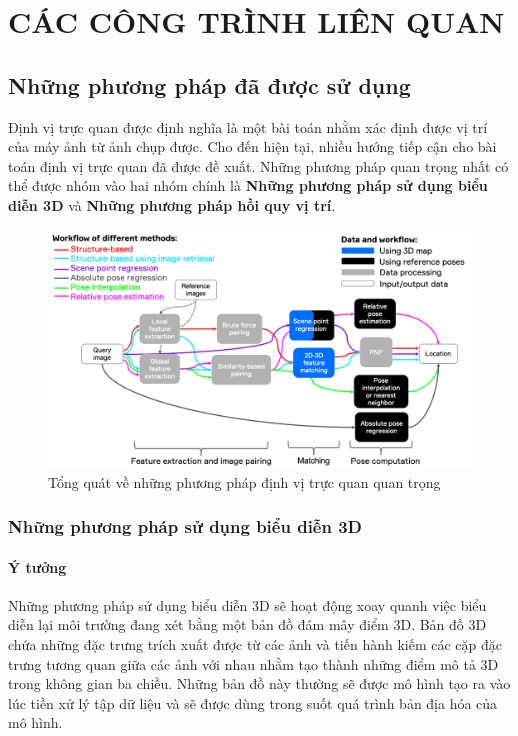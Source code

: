 \chapter{CÁC CÔNG TRÌNH LIÊN QUAN}

\section{Những phương pháp đã được sử dụng}

Định vị trực quan được định nghĩa là một bài toán nhằm xác định được vị trí của máy ảnh từ ảnh chụp được. Cho đến hiện tại, nhiều hướng tiếp cận cho bài toán định vị trực quan đã được đề xuất. Những phương pháp quan trọng nhất có thể được nhóm vào hai nhóm chính là \textbf{Những phương pháp sử dụng biểu diễn 3D} và \textbf{Những phương pháp hồi quy vị trí}.

\begin{figure}[H]
    \centering
    \includegraphics[scale=0.45]{pics/Chapter2/overviewViLoc.png}
    \caption{Tổng quát về những phương pháp định vị trực quan quan trọng \cite{methodsLocal}}
\end{figure}

\subsection{Những phương pháp sử dụng biểu diễn 3D}
\subsubsection*{Ý tưởng}
Những phương pháp sử dụng biểu diễn 3D sẽ hoạt động xoay quanh việc biểu diễn lại môi trường đang xét bằng một bản đồ đám mây điểm 3D. Bản đồ 3D chứa những đặc trưng trích xuất được từ các ảnh và tiến hành kiếm các cặp đặc trưng tương quan giữa các ảnh với nhau nhằm tạo thành những điểm mô tả 3D trong không gian ba chiều. Những bản đồ này thường sẽ được mô hình tạo ra vào lúc tiền xử lý tập dữ liệu và sẽ được dùng trong suốt quá trình bản địa hóa của mô hình.
